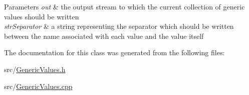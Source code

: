 \begin{DoxyParams}{Parameters}
{\em out} & the output stream to which the current collection of generic values should be written\\
\hline
{\em str\+Separator} & a string representing the separator which should be written between the name associated with each value and the value itself \\
\hline
\end{DoxyParams}


The documentation for this class was generated from the following files\+:\begin{DoxyCompactItemize}
\item 
src/\hyperlink{GenericValues_8h}{Generic\+Values.\+h}\item 
src/\hyperlink{GenericValues_8cpp}{Generic\+Values.\+cpp}\end{DoxyCompactItemize}
